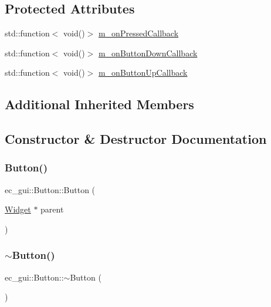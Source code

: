 \subsection*{Protected Attributes}
\begin{DoxyCompactItemize}
\item 
std\+::function$<$ void()$>$ \mbox{\hyperlink{classec__gui_1_1_button_aa4c9556354fa7cdd1f0365bccd1d2e28}{m\+\_\+on\+Pressed\+Callback}}
\item 
std\+::function$<$ void()$>$ \mbox{\hyperlink{classec__gui_1_1_button_a64f82706542dbeb39b5b0db328040bce}{m\+\_\+on\+Button\+Down\+Callback}}
\item 
std\+::function$<$ void()$>$ \mbox{\hyperlink{classec__gui_1_1_button_a7a45721355492e635fe2d49578b22e23}{m\+\_\+on\+Button\+Up\+Callback}}
\end{DoxyCompactItemize}
\subsection*{Additional Inherited Members}


\subsection{Constructor \& Destructor Documentation}
\mbox{\label{classec__gui_1_1_button_a179c52041fa20bbfc088020bafc31056}} 
\subsubsection{\texorpdfstring{Button()}{Button()}}
{\footnotesize\ttfamily ec\+\_\+gui\+::\+Button\+::\+Button (\begin{DoxyParamCaption}\item[{\mbox{\hyperlink{classec__gui_1_1_widget}{Widget}} $\ast$}]{parent }\end{DoxyParamCaption})\hspace{0.3cm}{\ttfamily [explicit]}}

\mbox{\label{classec__gui_1_1_button_a4e6b3dc59f83c39f5f644e8040f7577f}} 
\subsubsection{\texorpdfstring{$\sim$\+Button()}{~Button()}}
{\footnotesize\ttfamily ec\+\_\+gui\+::\+Button\+::$\sim$\+Button (\begin{DoxyParamCaption}{ }\end{DoxyParamCaption})\hspace{0.3cm}{\ttfamily [virtual]}}



